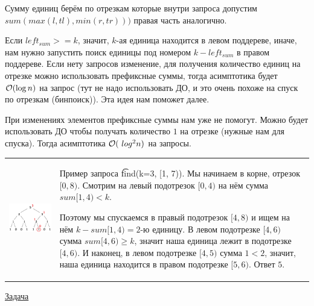 Сумму единиц берём по отрезкам которые внутри запроса допустим $sum(max(l, tl), min(r, tr)))$ правая часть аналогично.

Если $left_{sum} >= k$, значит, $k$-ая единица находится в левом поддереве, иначе, нам нужно запустить поиск единицы под номером $k - left_{sum}$ в правом поддереве. Если нету запросов изменение, для получения количество единиц на отрезке можно использовать префиксные суммы, тогда асимптотика будет $\mathcal{O}(\log n)$ на запрос (тут не надо использовать ДО, и это очень похоже на спуск по отрезкам (бинпоиск)). Эта идея нам поможет далее.

При изменениях элементов префиксные суммы нам уже не помогут. Можно будет использовать ДО чтобы получать количество $1$ на отрезке (нужные нам для спуска). Тогда асимптотика $\mathcal{O}(\ log ^ 2 n)$ на запросы. 


\begin{tabular}{cm{15cm}}
	\begin{minipage}{4cm}
		\includegraphics[scale=0.5]{k-th.png}
	\end{minipage} 
&
Пример запроса \t{find(k=3, [1, 7))}. Мы начинаем в корне, отрезок $[0,8)$. Смотрим на левый подотрезок $[0, 4)$ на нём сумма $sum [1,4) < k$. 

Поэтому мы спускаемся в правый подотрезок $[4,8)$ и ищем на нём $k-sum [1, 4) = 2$-ю единицу. В левом подотрезке $[4,6)$ сумма $sum [4, 6) \ge k$, значит наша единица лежит в подотрезке $[4,6)$. И наконец, в левом подотрезке $[4,5)$ сумма $1 < 2$, значит, наша единица находится в правом подотрезке $[5,6)$. Ответ $5$.

\end{tabular}

 
 \href{https://informatics.mccme.ru/mod/statements/view.php?chapterid=113632}{Задача}

